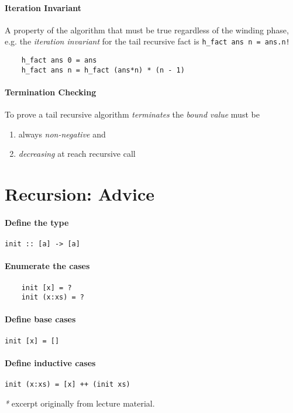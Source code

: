 \documentclass{article}
\begin{document}
\paragraph{Iteration Invariant}
A property of the algorithm that must be true regardless of the winding phase, e.g. the \textcolor{Rhodamine}{\emph{iteration invariant}} for the tail recursive fact is \texttt{\textcolor{Emerald}{h\_fact ans n} = ans.n!}
\begin{verbatim}
    h_fact ans 0 = ans
    h_fact ans n = h_fact (ans*n) * (n - 1)
\end{verbatim}

\paragraph{Termination Checking}
To prove a tail recursive algorithm \textcolor{Rhodamine}{\emph{terminates}} the \textcolor{Rhodamine}{\emph{bound value}} must be
\begin{enumerate}
    \item always \textcolor{Rhodamine}{\emph{non-negative}} and
    \item \textcolor{Rhodamine}{\emph{decreasing}} at reach recursive call
\end{enumerate}

\section{Recursion: Advice}
\paragraph{\textcolor{NavyBlue}{Define the type}} \texttt{init :: [a] -> [a]}
\paragraph{\textcolor{NavyBlue}{Enumerate the cases}}
\begin{verbatim}
    init [x] = ?
    init (x:xs) = ?
\end{verbatim}
\paragraph{\textcolor{NavyBlue}{Define base cases}}
\texttt{init [x] = []}
\paragraph{\textcolor{NavyBlue}{Define inductive cases}}
\texttt{init (x:xs) = [x] ++ (init xs)}

\textcolor{Rhodamine}{\emph{*}} excerpt originally from lecture material.
\end{document}
